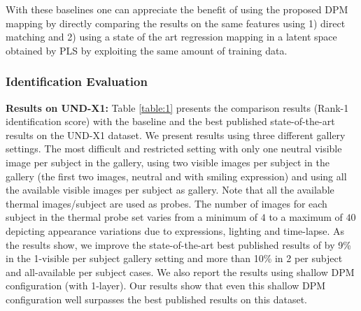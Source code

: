 \documentclass[smallextended,natbib]{svjour3}       \usepackage{graphicx}
\begin{document}
With these baselines one can appreciate the benefit of using the proposed DPM mapping by directly comparing the results on the same features using 1) direct matching and 2) using a state of the art regression mapping in a latent space obtained by PLS by exploiting the same amount of training data.  

\subsubsection{Identification Evaluation}
\textbf{Results on UND-X1:} Table \ref{table:1} presents the comparison results (Rank-1 identification score) with the baseline and the best published state-of-the-art results on the UND-X1 dataset. We present results using three different gallery settings. The most difficult and restricted setting with only one neutral visible image per subject in the gallery, using two visible images per subject in the gallery (the first two images, neutral and with smiling expression) and using all the available visible images per subject as gallery. Note that all the available thermal images/subject are used as probes. The number of images for each subject in the thermal probe set varies from a minimum of $4$ to a maximum of $40$ depicting appearance variations due to expressions, lighting and time-lapse. As the results show, we improve the state-of-the-art best published results of \cite{hu2015} by 9\% in the 1-visible per subject gallery setting and more than 10\% in 2 per subject and all-available per subject cases. We also report the results using shallow DPM configuration (with 1-layer). Our results show that even this shallow DPM configuration well surpasses the best published results on this dataset.
\end{document}
